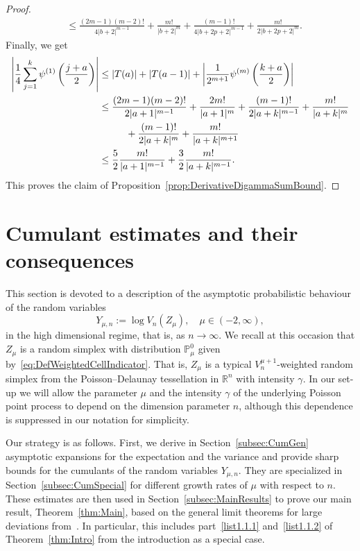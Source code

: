 \documentclass[10pt]{amsart}
\theoremstyle{definition}\newtheorem{defi}[theo]{Definition}\newtheorem{rema}[theo]{Remark}\newtheorem{exam}[theo]{Example}\newtheorem{exem}[theo]{Example}\newtheorem{nota}[theo]{Notation}
\newcommand{\R}{\mathbb{R}}
\newcommand{\PP}{\mathbb{P}}
\begin{document}
\begin{proof}
\begin{align*}
&\leq\frac{(2m-1)(m-2)!}{4|b+2|^{m-1}}+\frac{m!}{|b+2|^{m}}+\frac{(m-1)!}{4|b+2p+2|^{m-1}}+\frac{m!}{2|b+2p+2|^{m}}.
\end{align*}
Finally, we get
\begin{align*}
\left|\frac14\sum\limits_{j=1}^k\psi^{(1)}\left(\frac{j+a}{2}\right)\right|&\leq\left|T(a)\right|+\left|T(a-1)\right|+\left|\frac{1}{2^{m+1}}\psi^{(m)}\left(\frac{k+a}{2}\right)\right|\\
&\leq\frac{(2m-1)(m-2)!}{2|a+1|^{m-1}}+\frac{2m!}{|a+1|^{m}}+\frac{(m-1)!}{2|a+k|^{m-1}}+\frac{m!}{|a+k|^{m}}\\
&\mkern50mu +\frac{(m-1)!}{2|a+k|^{m}}+\frac{m!}{|a+k|^{m+1}}\\
&\leq \frac{5}{2} \frac{m!}{|a+1|^{m-1}}+\frac{3}{2}\frac{m!}{|a+k|^{m-1}}.
\end{align*}
This proves the claim of Proposition~\ref{prop:DerivativeDigammaSumBound}.
\end{proof}

\section{Cumulant estimates and their consequences}\label{sec:CumulantsResults}

This section is devoted to a description of the asymptotic probabilistic behaviour of the random variables
\begin{equation}\label{eq:DefYmun}
Y_{\mu,n}:=\log V_n(Z_{\mu}),\quad \mu\in(-2,\infty),
\end{equation}
in the high dimensional regime, that is, as $n\to\infty$. We recall at this occasion that $Z_\mu$ is a random simplex with distribution $\PP_\mu^0$ given by~\eqref{eq:DefWeightedCellIndicator}. That is, $Z_\mu$ is a typical $V_n^{\mu+1}$-weighted random simplex from the Poisson--Delaunay tessellation in $\R^n$ with intensity $\gamma$. In our set-up we will allow the parameter $\mu$ and the intensity $\gamma$ of the underlying Poisson point process to depend on the dimension parameter $n$, although this dependence is suppressed in our notation for simplicity.

Our strategy is as follows. First, we derive in Section~\ref{subsec:CumGen} asymptotic expansions for the expectation and the variance and provide sharp bounds for the cumulants of the random variables $Y_{\mu,n}$. They are specialized in Section~\ref{subsec:CumSpecial} for different growth rates of $\mu$ with respect to $n$. These estimates are then used in Section~\ref{subsec:MainResults} to prove our main result, Theorem~\ref{thm:Main}, based on the general limit theorems for large deviations from~\cite[Chapter~2]{SS91}. In particular, this includes part~\eqref{list1.1.1} and~\eqref{list1.1.2} of Theorem~\ref{thm:Intro} from the introduction as a special case.
\end{document}
